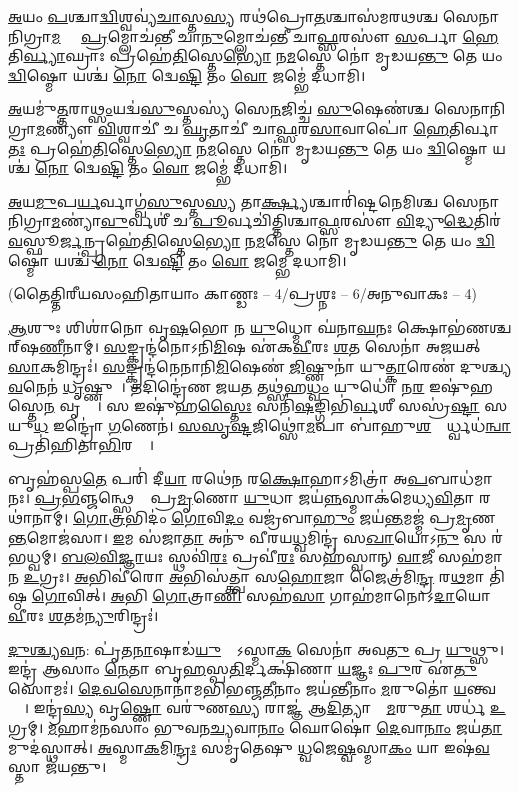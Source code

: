 \ul{𑌅}𑌯𑌂 \ul{𑌪}𑌶𑍍𑌚𑌾\ul{𑌦𑍍𑌵𑌿}𑌶𑍍𑌵𑌵𑍍𑌯॑\ul{𑌚𑌾}𑌸𑍍𑌤\ul{𑌸𑍍𑌯} 𑌰𑌥॑𑌪𑍍𑌰𑍋\ul{𑌤}𑌶𑍍𑌚𑌾𑌸॑𑌮𑌰𑌥𑌶𑍍𑌚 𑌸𑍇𑌨𑌾𑌨𑌿𑌗𑍍𑌰𑌾\ul{𑌮}𑌣𑍍𑌯𑍗᳚
\ul{𑌪𑍍𑌰}𑌮𑍍𑌲𑍋𑌚॑𑌨𑍍𑌤𑍀 𑌚𑌾\ul{𑌨𑍁}𑌮𑍍𑌲𑍋𑌚॑𑌨𑍍𑌤𑍀 𑌚𑌾\ul{𑌫𑍍𑌸}𑌰𑌸𑍗॑ \ul{𑌸}𑌰𑍍𑌪𑌾 \ul{𑌹𑍇}𑌤𑌿\ul{𑌰𑍍𑌵𑍍𑌯𑌾}𑌘𑍍𑌰𑌾𑌃 
𑌪𑍍𑌰𑌹𑍇॑\ul{𑌤𑌿}𑌸𑍍𑌤𑍇\ul{𑌭𑍍𑌯𑍋} 𑌨\ul{𑌮}𑌸𑍍𑌤𑍇 𑌨𑍋॑ 𑌮𑍃𑌡𑌯\ul{𑌨𑍍𑌤𑍁} 𑌤𑍇 𑌯𑌂 \ul{𑌦𑍍𑌵𑌿}𑌷𑍍𑌮𑍋 𑌯𑌶𑍍𑌚॑ \ul{𑌨𑍋} 𑌦𑍍𑌵𑍇\ul{𑌷𑍍𑌟𑌿} 𑌤𑌂 \ul{𑌵𑍋}  𑌜𑌮𑍍𑌭𑍇॑ 𑌦𑌧𑌾𑌮𑌿।

\ul{𑌅}𑌯𑌮𑍁॑\ul{𑌤𑍍𑌤}𑌰𑌾\ul{𑌥𑍍𑌸𑌂}𑌯𑌦𑍍𑌵॑\ul{𑌸𑍁}𑌸𑍍𑌤𑌸𑍍𑌯॑ 𑌸𑍇\ul{𑌨}𑌜𑌿𑌚𑍍𑌚॑ \ul{𑌸𑍁}𑌷𑍇𑌣॑𑌶𑍍𑌚 𑌸𑍇𑌨𑌾𑌨𑌿𑌗𑍍𑌰𑌾\ul{𑌮}𑌣𑍍𑌯𑍗॑
\ul{𑌵𑌿}𑌶𑍍𑌵𑌾𑌚𑍀॑ 𑌚 \ul{𑌘𑍃}𑌤𑌾𑌚𑍀॑ 𑌚𑌾\ul{𑌫𑍍𑌸}𑌰\ul{𑌸𑌾}𑌵𑌾𑌪𑍋॑ \ul{𑌹𑍇}𑌤𑌿𑌰𑍍𑌵𑌾\ul{𑌤𑌃} 
𑌪𑍍𑌰𑌹𑍇॑\ul{𑌤𑌿}𑌸𑍍𑌤𑍇\ul{𑌭𑍍𑌯𑍋} 𑌨\ul{𑌮}𑌸𑍍𑌤𑍇 𑌨𑍋॑ 𑌮𑍃𑌡𑌯\ul{𑌨𑍍𑌤𑍁} 𑌤𑍇 𑌯𑌂 \ul{𑌦𑍍𑌵𑌿}𑌷𑍍𑌮𑍋 𑌯𑌶𑍍𑌚॑ \ul{𑌨𑍋} 𑌦𑍍𑌵𑍇\ul{𑌷𑍍𑌟𑌿} 𑌤𑌂 \ul{𑌵𑍋}  𑌜𑌮𑍍𑌭𑍇॑ 𑌦𑌧𑌾𑌮𑌿।

\ul{𑌅}𑌯\ul{𑌮𑍁}𑌪\ul{𑌰𑍍𑌯}𑌰𑍍𑌵𑌾𑌗𑍍𑌵॑\ul{𑌸𑍁}𑌸𑍍𑌤\ul{𑌸𑍍𑌯} 𑌤𑌾\ul{𑌰𑍍𑌕𑍍𑌷𑍍𑌯}𑌶𑍍𑌚𑌾𑌰𑌿॑𑌷𑍍𑌟𑌨𑍇𑌮𑌿𑌶𑍍𑌚  𑌸𑍇𑌨𑌾𑌨𑌿\-𑌗𑍍𑌰𑌾\ul{𑌮}𑌣𑍍𑌯𑌾॑\ul{𑌵𑍁}𑌰𑍍𑌵𑌶𑍀॑ 𑌚
\ul{𑌪𑍂}𑌰𑍍𑌵𑌚𑌿॑𑌤𑍍𑌤𑌿𑌶𑍍𑌚𑌾\ul{𑌫𑍍𑌸}𑌰𑌸𑍗॑ \ul{𑌵𑌿}𑌦𑍍𑌯𑍁\ul{𑌦𑍍𑌧𑍇}𑌤𑌿𑌰॑\ul{𑌵}\-𑌸𑍍𑌫𑍂\ul{𑌰𑍍𑌜}𑌨𑍍𑌪𑍍𑌰𑌹𑍇॑\ul{𑌤𑌿}𑌸𑍍𑌤𑍇\ul{𑌭𑍍𑌯𑍋}
𑌨\ul{𑌮}𑌸𑍍𑌤𑍇 𑌨𑍋॑ 𑌮𑍃𑌡𑌯\ul{𑌨𑍍𑌤𑍁} 𑌤𑍇 𑌯𑌂 \ul{𑌦𑍍𑌵𑌿}𑌷𑍍𑌮𑍋 𑌯𑌶𑍍𑌚॑ \ul{𑌨𑍋} 𑌦𑍍𑌵𑍇\ul{𑌷𑍍𑌟𑌿} 𑌤𑌂 \ul{𑌵𑍋}  𑌜𑌮𑍍𑌭𑍇 𑌦𑌧𑌾𑌮𑌿।


\centerline{\normalsize (𑌤𑍈𑌤𑍍𑌤𑌿𑌰𑍀𑌯𑌸𑌂𑌹𑌿𑌤𑌾𑌯𑌾𑌂 𑌕𑌾𑌣𑍍𑌡𑌃 – 4/𑌪𑍍𑌰𑌶𑍍𑌨𑌃 – 6/𑌅𑌨𑍁𑌵𑌾𑌕𑌃 – 4)}

\ul{𑌆}𑌶𑍁𑌃 𑌶𑌿𑌶𑌾॑𑌨𑍋 𑌵𑍃\ul{𑌷}𑌭𑍋 𑌨 \ul{𑌯𑍁}𑌧𑍍𑌮𑍋 𑌘॑𑌨𑌾\ul{𑌘}𑌨𑌃 𑌕𑍍𑌷𑍋𑌭॑𑌣𑌶𑍍𑌚𑌰𑍍‌𑌷\ul{𑌣𑍀}𑌨𑌾𑌮𑍍। \ul{𑌸}𑌙𑍍𑌕𑍍𑌰𑌨𑍍𑌦॑𑌨𑍋𑌽𑌨𑌿\ul{𑌮𑌿}𑌷 𑌏॑𑌕\ul{𑌵𑍀}𑌰𑌃 \ul{𑌶}𑌤 𑌸𑍇𑌨𑌾॑ 𑌅𑌜𑌯𑌤𑍍 \ul{𑌸𑌾}𑌕𑌮𑌿𑌨𑍍𑌦𑍍𑌰𑌃॑। \ul{𑌸}𑌙𑍍𑌕𑍍𑌰𑌨𑍍𑌦॑𑌨𑍇𑌨𑌾𑌨𑌿\ul{𑌮𑌿}𑌷𑍇𑌣॑ \ul{𑌜𑌿}𑌷𑍍𑌣𑍁𑌨𑌾॑ 𑌯𑍁\ul{𑌤𑍍𑌕𑌾}𑌰𑍇𑌣॑ 𑌦𑍁𑌶𑍍𑌚𑍍𑌯\ul{𑌵}𑌨𑍇𑌨॑ \ul{𑌧𑍃}𑌷𑍍𑌣𑍁𑌨𑌾᳚। 𑌤𑌦𑌿𑌨𑍍𑌦𑍍𑌰𑍇॑𑌣 𑌜𑌯\ul{𑌤} 𑌤𑌥𑍍𑌸॑𑌹\ul{𑌧𑍍𑌵𑌂} 𑌯𑍁𑌧𑍋॑ 𑌨\ul{𑌰} 𑌇𑌷𑍁॑𑌹𑌸𑍍𑌤𑍇\ul{𑌨} 𑌵𑍃𑌷𑍍𑌣𑌾᳚। 𑌸 𑌇𑌷𑍁॑𑌹\ul{𑌸𑍍𑌤𑍈𑌃} 𑌸𑌨𑌿॑\ul{𑌷}𑌙𑍍𑌗𑌿𑌭𑌿॑\ul{𑌰𑍍𑌵}𑌶𑍀 𑌸𑌸𑍍𑌰॑\ul{𑌷𑍍𑌟𑌾} 𑌸 𑌯𑍁\ul{𑌧} 𑌇𑌨𑍍𑌦𑍍𑌰𑍋॑ \ul{𑌗}𑌣𑍇𑌨॑। \ul{𑌸}\ul{}\ul{𑌸𑍃}\ul{𑌷𑍍𑌟}𑌜𑌿𑌥𑍍𑌸𑍋॑\ul{𑌮}𑌪𑌾 𑌬𑌾॑𑌹𑍁\ul{𑌶}𑌧𑍍𑌯𑍂᳚𑌰𑍍𑌧𑍍𑌵𑌧॑\ul{𑌨𑍍𑌵𑌾} 𑌪𑍍𑌰𑌤𑌿॑𑌹𑌿𑌤𑌾\ul{𑌭𑌿}𑌰𑌸𑍍𑌤𑌾᳚।

𑌬𑍃𑌹॑𑌸𑍍𑌪\ul{𑌤𑍇} 𑌪𑌰𑌿॑ 𑌦𑍀\ul{𑌯𑌾} 𑌰𑌥𑍇॑𑌨 𑌰\ul{𑌕𑍍𑌷𑍋}𑌹𑌾𑌽𑌮𑌿𑌤𑍍𑌰𑌾॑ 𑌅\ul{𑌪}𑌬𑌾𑌧॑𑌮𑌾𑌨𑌃। \ul{𑌪𑍍𑌰}\ul{𑌭}𑌞𑍍𑌜𑌨𑍍𑌥𑍍𑌸𑍇𑌨𑌾𑌃᳚ 𑌪𑍍𑌰\ul{𑌮𑍃}𑌣𑍋 \ul{𑌯𑍁}𑌧𑌾 𑌜𑌯॑\ul{𑌨𑍍𑌨}𑌸𑍍𑌮𑌾𑌕॑𑌮𑍇𑌧𑍍𑌯\ul{𑌵𑌿}𑌤𑌾 𑌰𑌥𑌾॑𑌨𑌾𑌮𑍍। \ul{𑌗𑍋}\ul{𑌤𑍍𑌰}𑌭𑌿𑌦𑌂॑ \ul{𑌗𑍋}𑌵𑌿\ul{𑌦𑌂} 𑌵𑌜𑍍𑌰॑𑌬𑌾\ul{𑌹𑍁𑌂} 𑌜𑌯॑\ul{𑌨𑍍𑌤}𑌮𑌜𑍍𑌮॑ 𑌪𑍍𑌰\ul{𑌮𑍃}𑌣\ul{𑌨𑍍𑌤}𑌮𑍋𑌜॑𑌸𑌾। \ul{𑌇}𑌮 𑌸॑𑌜𑌾\ul{𑌤𑌾} 𑌅𑌨𑍁॑ 𑌵𑍀𑌰𑌯\ul{𑌧𑍍𑌵}𑌮𑌿𑌨𑍍𑌦𑍍𑌰॑ 𑌸\ul{𑌖𑌾}𑌯𑍋𑌽\ul{𑌨𑍁} 𑌸 𑌰॑𑌭𑌧𑍍𑌵𑌮𑍍। \ul{𑌬}\ul{𑌲}\ul{𑌵𑌿}\ul{𑌜𑍍𑌞𑌾}𑌯𑌃 𑌸𑍍𑌥𑌵𑌿॑\ul{𑌰𑌃} 𑌪𑍍𑌰𑌵𑍀॑\ul{𑌰𑌃} 𑌸𑌹॑𑌸𑍍𑌵𑌾𑌨𑍍 \ul{𑌵𑌾}𑌜𑍀 𑌸𑌹॑𑌮𑌾𑌨 \ul{𑌉}𑌗𑍍𑌰𑌃। \ul{𑌅}𑌭𑌿𑌵𑍀॑𑌰𑍋 \ul{𑌅}𑌭𑌿𑌸॑𑌤𑍍𑌤𑍍𑌵𑌾 𑌸\ul{𑌹𑍋}𑌜𑌾 𑌜𑍈𑌤𑍍𑌰॑𑌮𑌿\ul{𑌨𑍍𑌦𑍍𑌰} 𑌰\ul{𑌥}𑌮𑌾 𑌤𑌿॑𑌷𑍍𑌠 \ul{𑌗𑍋}𑌵𑌿𑌤𑍍। \ul{𑌅}𑌭𑌿 \ul{𑌗𑍋}𑌤𑍍𑌰𑌾\ul{𑌣𑌿} 𑌸𑌹॑\ul{𑌸𑌾} 𑌗𑌾𑌹॑𑌮𑌾𑌨𑍋𑌽\ul{𑌦𑌾}𑌯𑍋 \ul{𑌵𑍀}𑌰𑌃 \ul{𑌶}𑌤𑌮॑\ul{𑌨𑍍𑌯𑍁}𑌰𑌿𑌨𑍍𑌦𑍍𑌰𑌃॑।

\ul{𑌦𑍁}\ul{𑌶𑍍𑌚𑍍𑌯}\ul{𑌵}𑌨: 𑌪𑍃॑𑌤\ul{𑌨𑌾}𑌷𑌾𑌡॑\ul{𑌯𑍁}𑌧𑍍𑌯𑍋᳚𑌽𑌸𑍍𑌮𑌾\ul{𑌕}\ul{} 𑌸𑍇𑌨𑌾॑ 𑌅𑌵\ul{𑌤𑍁} 𑌪𑍍𑌰 \ul{𑌯𑍁}𑌥𑍍𑌸𑍁। 𑌇𑌨𑍍𑌦𑍍𑌰॑ 𑌆𑌸𑌾𑌂 \ul{𑌨𑍇}𑌤𑌾 𑌬𑍃\ul{𑌹}𑌸𑍍𑌪\ul{𑌤𑌿}𑌰𑍍𑌦𑌕𑍍𑌷𑌿॑𑌣𑌾 \ul{𑌯}𑌜𑍍𑌞𑌃 \ul{𑌪𑍁}𑌰 𑌏॑\ul{𑌤𑍁} 𑌸𑍋𑌮𑌃॑। \ul{𑌦𑍇}\ul{𑌵}\ul{𑌸𑍇}𑌨𑌾𑌨𑌾॑𑌮𑌭𑌿𑌭𑌞𑍍𑌜\ul{𑌤𑍀}𑌨𑌾𑌂 𑌜𑌯॑𑌨𑍍𑌤𑍀𑌨𑌾𑌂 \ul{𑌮}𑌰𑍁𑌤𑍋॑ \ul{𑌯}𑌨𑍍𑌤𑍍𑌵𑌗𑍍𑌰𑍇᳚। 𑌇𑌨𑍍𑌦𑍍𑌰॑\ul{𑌸𑍍𑌯} 𑌵𑍃\ul{𑌷𑍍𑌣𑍋} 𑌵𑌰𑍁॑𑌣\ul{𑌸𑍍𑌯} 𑌰𑌾𑌜𑍍𑌞॑ 𑌆\ul{𑌦𑌿}𑌤𑍍𑌯𑌾𑌨𑌾𑌂᳚ \ul{𑌮}𑌰𑍁\ul{𑌤𑌾}\ul{} 𑌶𑌰𑍍𑌧॑ \ul{𑌉}𑌗𑍍𑌰𑌮𑍍। \ul{𑌮}𑌹𑌾𑌮॑𑌨𑌸𑌾𑌂 𑌭𑍁𑌵𑌨\ul{𑌚𑍍𑌯}𑌵𑌾\ul{𑌨𑌾𑌂} 𑌘𑍋𑌷𑍋॑ \ul{𑌦𑍇}𑌵𑌾\ul{𑌨𑌾𑌂} 𑌜𑌯॑\ul{𑌤𑌾}𑌮𑍁𑌦॑𑌸𑍍𑌥𑌾𑌤𑍍। \ul{𑌅}𑌸𑍍𑌮𑌾\ul{𑌕}𑌮𑌿\ul{𑌨𑍍𑌦𑍍𑌰𑌃} 𑌸𑌮𑍃॑𑌤𑍇𑌷𑍁 \ul{𑌧𑍍𑌵}𑌜𑍇\ul{𑌷𑍍𑌵}𑌸𑍍𑌮𑌾\ul{𑌕𑌂} 𑌯𑌾 𑌇𑌷॑\ul{𑌵}𑌸𑍍𑌤𑌾 𑌜॑𑌯𑌨𑍍𑌤𑍁।

